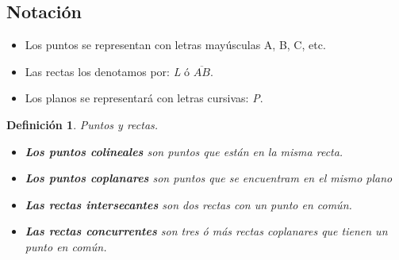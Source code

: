 \documentclass[10pt]{book}
\newtheorem{def.}{\textbf{Definición}}[chapter]%
\begin{document}
\subsection*{Notación}
\begin{itemize}
\item Los puntos se representan con letras mayúsculas A, B, C, etc.
\begin{center}
\end{center}
\item Las rectas los denotamos por: \textit{L} ó $\overline{AB}$.
\begin{center}
\end{center}
\item Los planos se representará con letras cursivas: \textit{P}.
\end{itemize}
\begin{center}
\end{center}
\begin{tcolorbox}
\begin{def.}Puntos y rectas.
\begin{itemize}
\item \textbf{Los puntos colineales} son puntos que están en la misma recta.
\item \textbf{Los puntos coplanares} son puntos que se encuentram en el mismo plano
\item \textbf{Las rectas intersecantes} son dos rectas con un punto en común.
\item \textbf{Las rectas concurrentes} son tres ó más rectas coplanares que tienen un punto en común.
\end{itemize}
\end{def.}
\end{tcolorbox}
\end{document}
